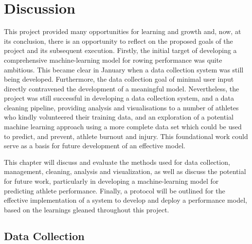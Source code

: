 \chapter{\label{ch:discussion}Discussion}
This project provided many opportunities for learning and growth and, now, at its conclusion, there is an opportunity to reflect on the proposed goals of the project and its subsequent execution. Firstly, the initial target of developing a comprehensive machine-learning model for rowing performance was quite ambitious. This became clear in January when a data collection system was still being developed. Furthermore, the data collection goal of minimal user input directly contravened the development of a meaningful model. Nevertheless, the project was still successful in developing a data collection system, and a data cleaning pipeline, providing analysis and visualisations to a number of athletes who kindly volunteered their training data, and an exploration of a potential machine learning approach using a more complete data set which could be used to predict, and prevent, athlete burnout and injury. This foundational work could serve as a basis for future development of an effective model. 

This chapter will discuss and evaluate the methods used for data collection, management, cleaning, analysis and visualization, as well as discuss the potential for future work, particularly in developing a machine-learning model for predicting athlete performance. Finally, a protocol will be outlined for the effective implementation of a system to develop and deploy a performance model, based on the learnings gleaned throughout this project.

\section{Data Collection}
